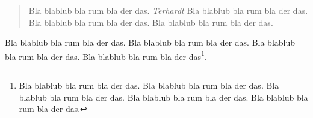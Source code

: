 \documentclass[a4paper]{scrartcl}
\begin{document}
\begin{abstract}
Bla blablub bla rum bla der das. \textit{Terhardt} Bla blablub bla rum bla der das. Bla blablub bla rum bla der das.
Bla blablub bla rum bla der das.
\end{abstract}

Bla blablub bla rum bla der das. Bla blablub bla rum bla der das. Bla blablub bla rum bla der das. Bla blablub bla rum
bla der das\footnote{Bla blablub bla rum bla der das. Bla blablub bla rum bla der das. Bla blablub bla rum bla der
das. Bla blablub bla rum bla der das. Bla blablub bla rum bla der das.}.
\end{document}
